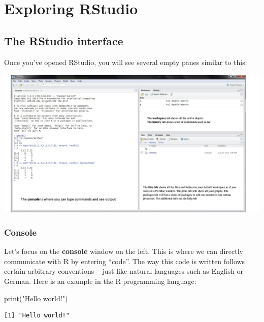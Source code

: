 \documentclass[
  11pt,
  letterpaper,
  DIV=11,
  numbers=noendperiod]{scrreprt}
\newenvironment{Shaded}{\begin{snugshade}}{\end{snugshade}}
\newcommand{\FunctionTok}[1]{\textcolor[rgb]{0.28,0.35,0.67}{#1}}
\newcommand{\NormalTok}[1]{\textcolor[rgb]{0.00,0.23,0.31}{#1}}
\newcommand{\StringTok}[1]{\textcolor[rgb]{0.13,0.47,0.30}{#1}}
\begin{document}
\chapter{Exploring RStudio}\label{exploring-rstudio}

\section{The RStudio interface}\label{the-rstudio-interface}

Once you've opened RStudio, you will see several empty panes similar to
this:

\begin{center}
\includegraphics{RStudio.png}
\end{center}

\subsection{Console}\label{console}

Let's focus on the \textbf{console} window on the left. This is where we
can directly communicate with R by entering ``code''. The way this code
is written follows certain arbitrary conventions -- just like natural
languages such as English or German. Here is an example in the R
programming language:

\begin{Shaded}
\begin{Highlighting}[]
\FunctionTok{print}\NormalTok{(}\StringTok{"Hello world!"}\NormalTok{)}
\end{Highlighting}
\end{Shaded}

\begin{verbatim}
[1] "Hello world!"
\end{verbatim}
\end{document}
